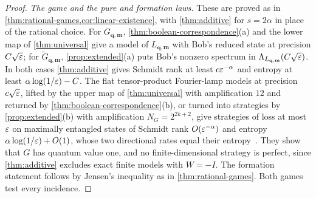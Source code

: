 \begin{proof}
\emph{The game and the pure and formation laws.} These are proved as in \cref{thm:rational-games,cor:linear-existence}, with
\cref{thm:additive} for $s=2\alpha$ in place of the rational choice. For $G_{\mathbf q,\mathbf m}$, \cref{thm:boolean-correspondence}(a) and the
lower map of \cref{thm:universal} give a model of $L_{\mathbf q,\mathbf m}$ with Bob's reduced state at precision $C\sqrt{\varepsilon}$; for
$\widetilde G_{\mathbf q,\mathbf m}$, \cref{prop:extended}(a) puts Bob's nonzero spectrum in $\Lambda_{L_{\mathbf q,\mathbf m}}(C\sqrt{\varepsilon})$. In both cases
\cref{thm:additive} gives Schmidt rank at least $c\varepsilon^{-\alpha}$ and entropy at least $\alpha\log(1/\varepsilon)-C$. The flat tensor-product
Fourier-lamp models at precision $c\sqrt{\varepsilon}$, lifted by the upper map of \cref{thm:universal} with amplification $12$ and returned by
\cref{thm:boolean-correspondence}(b), or turned into strategies by \cref{prop:extended}(b) with amplification $N_G=2^{2k+2}$, give strategies of loss
at most $\varepsilon$ on maximally entangled states of Schmidt rank $O(\varepsilon^{-\alpha})$ and entropy $\alpha\log(1/\varepsilon)+O(1)$, whose two directional
rates equal their entropy~\cite{BBPS96}. They show that $G$ has quantum value one, and no finite-dimensional strategy is perfect, since
\cref{thm:additive} excludes exact finite models with $W=-I$. The formation statement follows by Jensen's inequality as in
\cref{thm:rational-games}. Both games test every incidence.


\end{proof}
